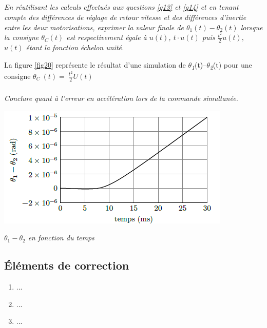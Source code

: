 \documentclass[10pt,fleqn]{article} %
\begin{document}
\begin{multicols}{2}
\subparagraph{}\textit{En réutilisant les calculs effectués aux questions \ref{q13} et \ref{q14} et en
  tenant compte des différences de réglage de retour vitesse et des
  différences d'inertie entre les deux motorisations, exprimer la valeur
  finale de $\theta_1(t)-\theta_2(t)$ lorsque la consigne $\theta_C(t)$ est respectivement
  égale à $u(t)$, $t\cdot u(t)$ puis \(\frac{t^{2}}{2}u(t),\) $u(t)$ étant la
  fonction échelon unité.}

La figure \ref{fig20} représente le résultat d'une simulation de
$\theta$\emph{\textsubscript{1}}(t)--$\theta$\emph{\textsubscript{2}}(t) pour une
consigne \(\theta_{C}\ \left( t \right) = \ \frac{t^{2}}{2}U(t)\)

\subparagraph{}\textit{Conclure quant à l'erreur en accélération lors de la commande
  simultanée.}



\begin{center}
\includegraphics[width=0.6\linewidth]{images/image21.png}

\textit{$\theta_1-\theta_2$ en
fonction du temps \label{fig20}}
\end{center}


\subsection*{Éléments de correction}
\begin{enumerate}
\item ...
\item ...
\item ...
\end{enumerate}
\end{multicols}
\end{document}
